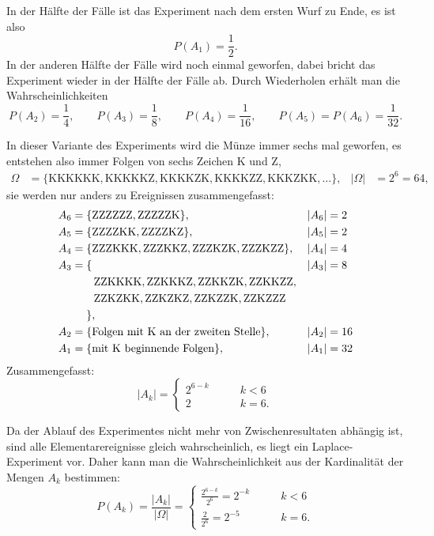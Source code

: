 \begin{loesung}
\begin{teilaufgaben}
In der Hälfte der Fälle ist das Experiment nach dem ersten Wurf zu Ende,
es ist also
\[
P(A_1) = \frac12.
\]
In der anderen Hälfte der Fälle wird noch einmal geworfen, dabei bricht das 
Experiment wieder in der Hälfte der Fälle ab.
Durch Wiederholen erhält man die Wahrscheinlichkeiten
\[
P(A_2)=\frac14,\qquad
P(A_3)=\frac18,\qquad
P(A_4)=\frac1{16},\qquad
P(A_5)=P(A_6)=\frac1{32}.
\]
\item
In dieser Variante des Experiments wird die Münze immer sechs mal geworfen,
es entstehen also immer Folgen von sechs Zeichen K und Z,
\begin{align*}
\Omega&=\{
\text{KKKKKK},
\text{KKKKKZ},
\text{KKKKZK},
\text{KKKKZZ},
\text{KKKZKK},\dots
\},&|\Omega|&=2^6=64,
\end{align*}
sie werden nur anders zu Ereignissen zusammengefasst:
\begin{align*}
A_6&=\{\text{ZZZZZZ}, \text{ZZZZZK}\},&|A_6|&=2\\
A_5&=\{
\text{ZZZZKK},
\text{ZZZZKZ}
\},&|A_5|&=2\\
A_4&=\{
\text{ZZZKKK},
\text{ZZZKKZ},
\text{ZZZKZK},
\text{ZZZKZZ}
\},&|A_4|&=4\\
A_3&=\{
&|A_3|&=8\\
&\qquad
\text{ZZKKKK},
\text{ZZKKKZ},
\text{ZZKKZK},
\text{ZZKKZZ},\\
&\qquad\text{ZZKZKK},
\text{ZZKZKZ},
\text{ZZKZZK},
\text{ZZKZZZ}\\
&\phantom{\mathstrut=\mathstrut }\},\\
A_2&=\{\text{Folgen mit K an der zweiten Stelle}\},&|A_2|&=16\\
A_1&=\{\text{mit K beginnende Folgen}\},&|A_1|&=32\\
\end{align*}
Zusammengefasst:
\[
|A_k|=\begin{cases}
2^{6-k}&\qquad k<6\\
2&\qquad k=6.
\end{cases}
\]
\item
Da der Ablauf des Experimentes nicht mehr von Zwischenresultaten abhängig ist,
sind alle Elementarereignisse gleich wahrscheinlich, es liegt ein Laplace-Experiment
vor.
Daher kann man die Wahrscheinlichkeit aus der Kardinalität der Mengen $A_k$
bestimmen:
\[
P(A_k)=\frac{|A_k|}{|\Omega|}
=\begin{cases}
\frac{2^{6-k}}{2^6}=2^{-k}&\qquad k<6\\
\frac{2}{2^6}=2^{-5}&\qquad k=6.
\end{cases}
\]
\item

\end{teilaufgaben}
\end{loesung}
